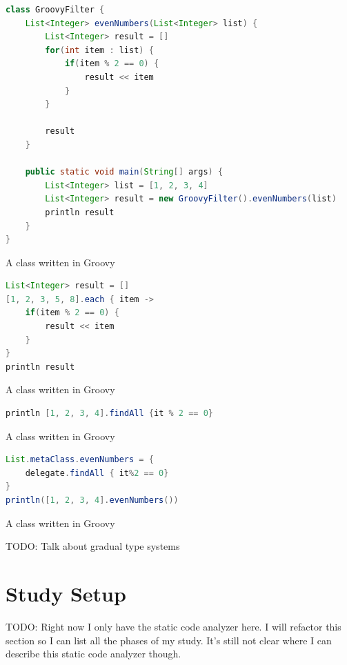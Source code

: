 \documentclass[preprint]{sigplanconf}
\begin{document}
\begin{Listing}[ht]
\begin{lstlisting}[language=Java,tabsize=2,breaklines=true]
class GroovyFilter {
	List<Integer> evenNumbers(List<Integer> list) {
		List<Integer> result = []
		for(int item : list) {
			if(item % 2 == 0) {
				result << item
			}
		}

		result
	}

	public static void main(String[] args) {
		List<Integer> list = [1, 2, 3, 4]
		List<Integer> result = new GroovyFilter().evenNumbers(list)
		println result
	}
}
\end{lstlisting}
\caption{A class written in Groovy}
\label{codigoGroovy}
\end{Listing}


\begin{Listing}[ht]
\begin{lstlisting}[language=Java,tabsize=2,breaklines=true]
List<Integer> result = []
[1, 2, 3, 5, 8].each { item ->
	if(item % 2 == 0) {
		result << item
	}
}
println result
\end{lstlisting}
\caption{A class written in Groovy}
\label{codigoGroovy}
\end{Listing}

\begin{Listing}[ht]
\begin{lstlisting}[language=Java,tabsize=2,breaklines=true]
println [1, 2, 3, 4].findAll {it % 2 == 0}
\end{lstlisting}
\caption{A class written in Groovy}
\label{codigoGroovy}
\end{Listing}




\begin{Listing}[ht]
\begin{lstlisting}[language=Java,tabsize=2,breaklines=true]
List.metaClass.evenNumbers = {
	delegate.findAll { it%2 == 0}
}
println([1, 2, 3, 4].evenNumbers())
\end{lstlisting}
\caption{A class written in Groovy}
\label{codigoGroovy}
\end{Listing}

TODO: Talk about gradual type systems \cite{gray05,gray08,gray11,siek07,takikawa12}

\section{Study Setup\label{sec:Configura=0000E7=0000E3o-do-Estudo}}
TODO: Right now I only have the static code analyzer here. I will refactor this section so I can list all the phases of my study. It's still not clear where I can describe this static code analyzer though.
\end{document}
